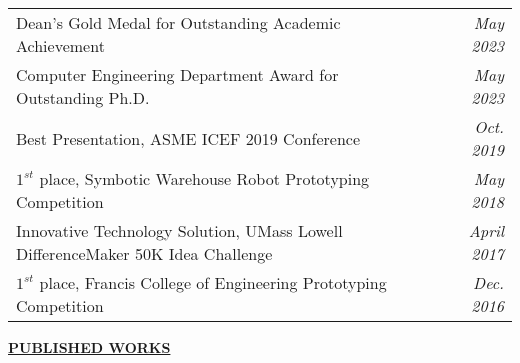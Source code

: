 \documentclass{letter}
\begin{document}
    \begin{tabular*}{\linewidth}{L r}
        Dean’s Gold Medal for Outstanding Academic Achievement & \textit{May 2023} \\
        Computer Engineering Department Award for Outstanding Ph.D. & \textit{May 2023} \\
        Best Presentation, ASME ICEF 2019 Conference & \textit{Oct. 2019} \\
        $ 1^{st} $ place, Symbotic Warehouse Robot Prototyping Competition & \textit{May 2018} \\
        Innovative Technology Solution, UMass Lowell DifferenceMaker 50K Idea Challenge & \textit{April 2017} \\
        $ 1^{st} $ place, Francis College of Engineering Prototyping Competition & \textit{Dec. 2016}
    \end{tabular*}

    \medskip \large \textbf{\underline{PUBLISHED WORKS}} \medskip \footnotesize
\end{document}
